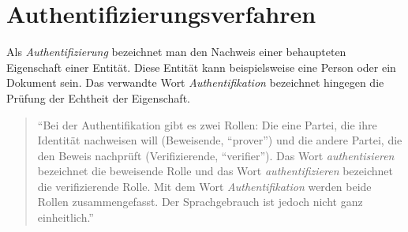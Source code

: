 \documentclass[11pt,a4paper,ngerman]{scrreprt}
\begin{document}
\section{Authentifizierungsverfahren}\label{sec:Authentifizierung}
Als \emph{Authentifizierung} bezeichnet man den Nachweis einer behaupteten Eigenschaft einer Entität. Diese Entität kann beispielsweise eine Person oder ein Dokument sein. Das verwandte Wort \emph{Authentifikation} bezeichnet hingegen die Prüfung der Echtheit der Eigenschaft.
\begin{quote}
    ``Bei der Authentifikation gibt es zwei Rollen: Die eine Partei, die ihre Identität nachweisen will (Beweisende, ``prover'') und die andere Partei, die den Beweis nachprüft (Verifizierende, ``verifier''). Das Wort \emph{authentisieren} bezeichnet die beweisende Rolle und das Wort \emph{authentifizieren} bezeichnet die verifizierende Rolle. Mit dem Wort \emph{Authentifikation} werden beide Rollen zusammengefasst. Der Sprachgebrauch ist jedoch nicht ganz einheitlich.'' \cite[S. 149]{kryptSec11}
\end{quote}
\end{document}

